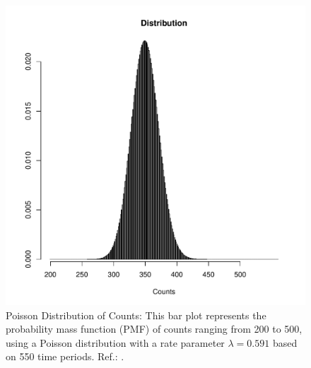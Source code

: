 \begin{figure}
\begin{knitrout}
\color{fgcolor}

{\centering \includegraphics[width=\textwidth-3cm]{figure/ch02_figunnamed-chunk-4-1} 

}


\end{knitrout}
  \caption{Poisson Distribution of Counts: This bar plot represents the probability mass function (PMF) of counts ranging from 200 to 500, using a Poisson distribution with a rate parameter $\lambda = 0.591$ based on 550 time periods. Ref.: .}
  \label{fig:2_3}
\end{figure}

